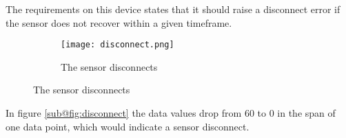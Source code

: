 The requirements on this device states that it should raise a disconnect error if the sensor does not recover within a given timeframe.

\begin{figure}[H]
\centering
	\begin{subfigure}[b]{0.3\textwidth}
    \texttt{[image: disconnect.png]}
    \caption{The sensor disconnects}
    \label{fig:disconnect}
	\end{subfigure}
\end{figure}

In figure \ref{sub@fig:disconnect} the data values drop from 60 to 0 in the span of one data point, which would indicate a sensor disconnect.
